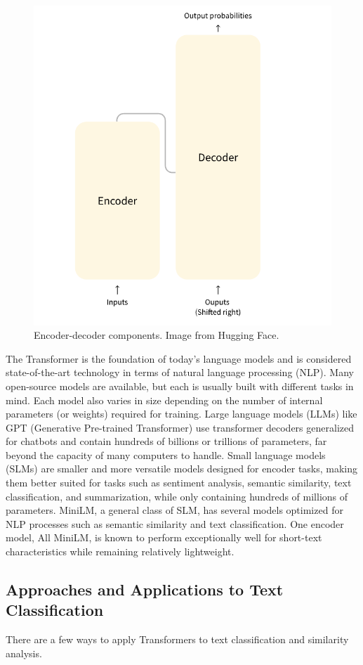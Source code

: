 \documentclass[12pt]{article}
\begin{document}
\begin{figure}
    \centering
    \includegraphics[width=0.5\linewidth]{images/transformers_blocks.png}
    \caption{Encoder-decoder components. Image from Hugging Face\cite{huggingface}.}
    \label{fig:encode-decode}
\end{figure}
The Transformer is the foundation of today's language models and is considered state-of-the-art technology in terms of natural language processing (NLP). Many open-source models are available, but each is usually built with different tasks in mind. Each model also varies in size depending on the number of internal parameters (or weights) required for training. Large language models (LLMs) like GPT (Generative Pre-trained Transformer) use transformer decoders generalized for chatbots and contain hundreds of billions or trillions of parameters, far beyond the capacity of many computers to handle. Small language models (SLMs) are smaller and more versatile models designed for encoder tasks, making them better suited for tasks such as sentiment analysis, semantic similarity, text classification, and summarization, while only containing hundreds of millions of parameters. MiniLM, a general class of SLM, has several models optimized for NLP processes such as semantic similarity and text classification\cite{minilm}. One encoder model, All MiniLM, is known to perform exceptionally well for short-text characteristics while remaining relatively lightweight.


\subsection{Approaches and Applications to Text Classification}\label{sec:techniques}

There are a few ways to apply Transformers to text classification and similarity analysis. 
\end{document}

